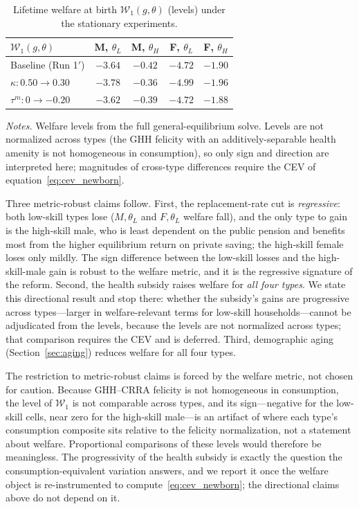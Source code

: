 \documentclass[12pt,a4paper]{article}
\begin{document}
\begin{table}[H]
\centering
\caption{Lifetime welfare at birth $\mathcal{W}_1(g,\theta)$ (levels) under the stationary experiments.}
\label{tab:policy_welfare}
\begin{tabular}{lcccc}
\toprule
$\mathcal{W}_1(g, \theta)$ & M, $\theta_L$ & M, $\theta_H$ & F, $\theta_L$ & F, $\theta_H$ \\
\midrule
Baseline (Run 1$'$)    & $-3.64$ & $-0.42$ & $-4.72$ & $-1.90$ \\
$\kappa: 0.50\to0.30$  & $-3.78$ & $-0.36$ & $-4.99$ & $-1.96$ \\
$\tau^m: 0\to-0.20$    & $-3.62$ & $-0.39$ & $-4.72$ & $-1.88$ \\
\bottomrule
\end{tabular}

\vspace{0.5em}
\begin{minipage}{0.92\textwidth}
\footnotesize \textit{Notes.} Welfare levels from the full general-equilibrium solve. Levels are not normalized across types (the GHH felicity with an additively-separable health amenity is not homogeneous in consumption), so only sign and direction are interpreted here; magnitudes of cross-type differences require the CEV of equation~\eqref{eq:cev_newborn}.
\end{minipage}
\end{table}

Three metric-robust claims follow. First, the replacement-rate cut is \emph{regressive}: both low-skill types lose ($M,\theta_L$ and $F,\theta_L$ welfare fall), and the only type to gain is the high-skill male, who is least dependent on the public pension and benefits most from the higher equilibrium return on private saving; the high-skill female loses only mildly. The sign difference between the low-skill losses and the high-skill-male gain is robust to the welfare metric, and it is the regressive signature of the reform. Second, the health subsidy raises welfare for \emph{all four types}. We state this directional result and stop there: whether the subsidy's gains are progressive across types---larger in welfare-relevant terms for low-skill households---cannot be adjudicated from the levels, because the levels are not normalized across types; that comparison requires the CEV and is deferred. Third, demographic aging (Section~\ref{sec:aging}) reduces welfare for all four types.

The restriction to metric-robust claims is forced by the welfare metric, not chosen for caution. Because GHH--CRRA felicity is not homogeneous in consumption, the level of $\mathcal{W}_1$ is not comparable across types, and its sign---negative for the low-skill cells, near zero for the high-skill male---is an artifact of where each type's consumption composite sits relative to the felicity normalization, not a statement about welfare. Proportional comparisons of these levels would therefore be meaningless. The progressivity of the health subsidy is exactly the question the consumption-equivalent variation answers, and we report it once the welfare object is re-instrumented to compute~\eqref{eq:cev_newborn}; the directional claims above do not depend on it.
\end{document}
